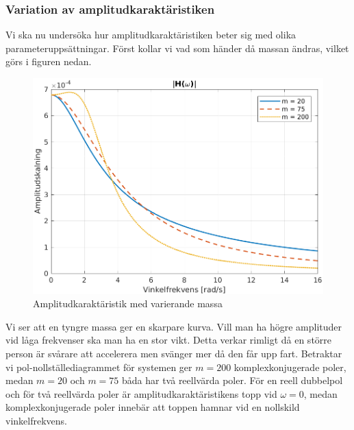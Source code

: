 \subsubsection{Variation av amplitudkaraktäristiken}
Vi ska nu undersöka hur amplitudkaraktäristiken beter sig med olika parameteruppsättningar. Först kollar vi vad som händer då massan ändras, vilket görs i figuren nedan.
\begin{figure}[H]
    \centering
    \includegraphics[scale=0.9]{bilder/amplitudkaraktaristik_variation_m}
    \caption{Amplitudkaraktäristik med varierande massa}
    \label{fig:amplitudkaraktaristik_variation_m}
\end{figure}
Vi ser att en tyngre massa ger en skarpare kurva. Vill man ha högre amplituder vid låga frekvenser ska man ha en stor vikt. Detta verkar rimligt då en större person är svårare att accelerera men svänger mer då den får upp fart. Betraktar vi pol-nollställediagrammet för systemen ger $m = 200$ komplexkonjugerade poler, medan $m = 20$ och $m = 75$ båda har två reellvärda poler. För en reell dubbelpol och för två reellvärda poler är amplitudkaraktäristikens topp vid $\omega = 0$, medan komplexkonjugerade poler innebär att toppen hamnar vid en nollskild vinkelfrekvens.

